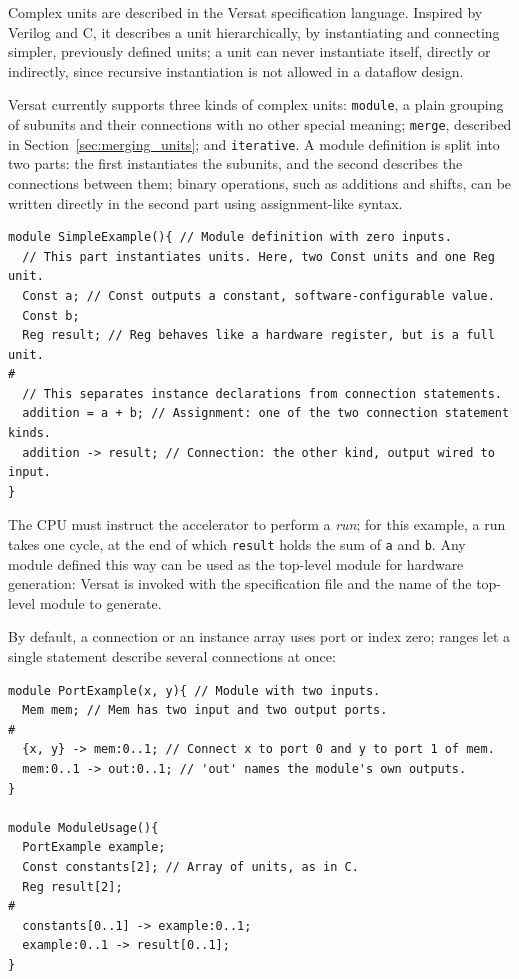 %

Complex units are described in the Versat specification language. Inspired
by Verilog and C, it describes a unit hierarchically, by instantiating and
connecting simpler, previously defined units; a unit can never instantiate
itself, directly or indirectly, since recursive instantiation is not
allowed in a dataflow design.

Versat currently supports three kinds of complex units: \texttt{module}, a
plain grouping of subunits and their connections with no other special
meaning; \texttt{merge}, described in Section~\ref{sec:merging_units}; and
\texttt{iterative}. A module definition is split into two parts: the first
instantiates the subunits, and the second describes the connections between
them; binary operations, such as additions and shifts, can be written
directly in the second part using assignment-like syntax.

\begin{lstlisting}
module SimpleExample(){ // Module definition with zero inputs.
  // This part instantiates units. Here, two Const units and one Reg unit.
  Const a; // Const outputs a constant, software-configurable value.
  Const b;
  Reg result; // Reg behaves like a hardware register, but is a full unit.
#
  // This separates instance declarations from connection statements.
  addition = a + b; // Assignment: one of the two connection statement kinds.
  addition -> result; // Connection: the other kind, output wired to input.
}
\end{lstlisting}

The CPU must instruct the accelerator to perform a \emph{run}; for this
example, a run takes one cycle, at the end of which \texttt{result} holds
the sum of \texttt{a} and \texttt{b}. Any module defined this way can be
used as the top-level module for hardware generation: Versat is invoked
with the specification file and the name of the top-level module to
generate.

By default, a connection or an instance array uses port or index zero;
ranges let a single statement describe several connections at once:

\begin{lstlisting}
module PortExample(x, y){ // Module with two inputs.
  Mem mem; // Mem has two input and two output ports.
#
  {x, y} -> mem:0..1; // Connect x to port 0 and y to port 1 of mem.
  mem:0..1 -> out:0..1; // 'out' names the module's own outputs.
}

module ModuleUsage(){
  PortExample example;
  Const constants[2]; // Array of units, as in C.
  Reg result[2];
#
  constants[0..1] -> example:0..1;
  example:0..1 -> result[0..1];
}
\end{lstlisting}
